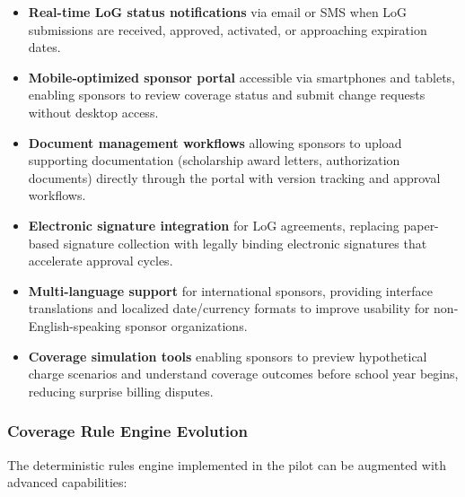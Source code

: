 \begin{itemize}
    \item \textbf{Real-time LoG status notifications} via email or SMS when LoG submissions are received, approved, activated, or approaching expiration dates.
    \item \textbf{Mobile-optimized sponsor portal} accessible via smartphones and tablets, enabling sponsors to review coverage status and submit change requests without desktop access.
    \item \textbf{Document management workflows} allowing sponsors to upload supporting documentation (scholarship award letters, authorization documents) directly through the portal with version tracking and approval workflows.
    \item \textbf{Electronic signature integration} for LoG agreements, replacing paper-based signature collection with legally binding electronic signatures that accelerate approval cycles.
    \item \textbf{Multi-language support} for international sponsors, providing interface translations and localized date/currency formats to improve usability for non-English-speaking sponsor organizations.
    \item \textbf{Coverage simulation tools} enabling sponsors to preview hypothetical charge scenarios and understand coverage outcomes before school year begins, reducing surprise billing disputes.
\end{itemize}

\subsubsection{Coverage Rule Engine Evolution}

The deterministic rules engine implemented in the pilot can be augmented with advanced capabilities:

